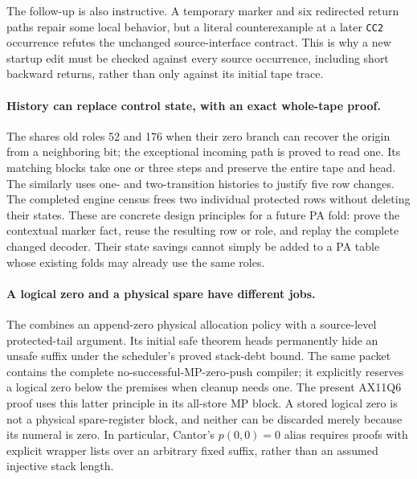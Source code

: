 The follow-up
is also instructive.  A temporary marker and six redirected return paths repair
some local behavior, but a literal counterexample at a later \texttt{CC2}
occurrence refutes the unchanged source-interface contract.  This is why a
new startup edit must be checked against every source occurrence, including
short backward returns, rather than only against its initial tape trace.

\paragraph{History can replace control state, with an exact whole-tape proof.}
The
shares old roles 52 and 176 when their zero branch can recover the origin
from a neighboring bit; the exceptional incoming path is proved to read one.
Its matching blocks take one or three steps and preserve the entire tape and
head.  The
similarly uses one- and two-transition histories to justify five row changes.
The completed engine census frees two individual protected rows without
deleting their states.  These are concrete design principles for a future PA
fold: prove the contextual marker fact, reuse the resulting row or role, and
replay the complete changed decoder.  Their state savings cannot simply be
added to a PA table whose existing folds may already use the same roles.

\paragraph{A logical zero and a physical spare have different jobs.}
The
combines an append-zero physical allocation policy with a source-level
protected-tail argument.  Its initial safe theorem heads permanently hide an
unsafe suffix under the scheduler's proved stack-debt bound.  The same packet
contains the complete no-successful-MP-zero-push compiler; it explicitly
reserves a logical zero below the premises when cleanup needs one.  The present
AX11Q6 proof uses this latter principle in its all-store MP block.  A stored
logical zero is not a physical spare-register block, and neither can be
discarded merely because its numeral is zero.  In particular, Cantor's
$p(0,0)=0$ alias requires proofs with explicit wrapper lists over an arbitrary
fixed suffix, rather than an assumed injective stack length.

